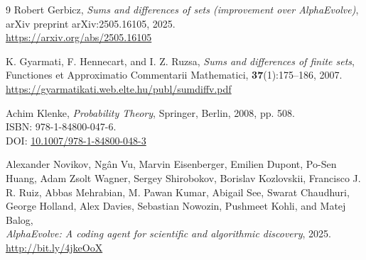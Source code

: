 \documentclass[12 pt]{article}
\begin{document}
\begin{thebibliography}{9}
Robert Gerbicz,
\textit{Sums and differences of sets (improvement over AlphaEvolve)},
arXiv preprint arXiv:2505.16105, 2025.\\
\url{https://arxiv.org/abs/2505.16105}

K. Gyarmati, F. Hennecart, and I. Z. Ruzsa,
\textit{Sums and differences of finite sets},
Functiones et Approximatio Commentarii Mathematici, \textbf{37}(1):175–186, 2007.\\
\url{https://gyarmatikati.web.elte.hu/publ/sumdiffv.pdf}

Achim Klenke,
\textit{Probability Theory},
Springer, Berlin, 2008, pp. 508.\\
ISBN: 978-1-84800-047-6.\\
DOI: \href{https://doi.org/10.1007/978-1-84800-048-3}{10.1007/978-1-84800-048-3}

Alexander Novikov, Ng\^an Vu, Marvin Eisenberger, Emilien Dupont, Po-Sen Huang, Adam Zsolt Wagner, Sergey Shirobokov, Borislav Kozlovskii, Francisco J. R. Ruiz, Abbas Mehrabian, M. Pawan Kumar, Abigail See, Swarat Chaudhuri, George Holland, Alex Davies, Sebastian Nowozin, Pushmeet Kohli, and Matej Balog,\\
\textit{AlphaEvolve: A coding agent for scientific and algorithmic discovery}, 2025.\\
\url{http://bit.ly/4jkeOoX}\end{thebibliography}
\end{document}
